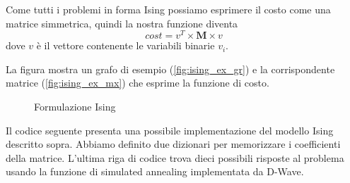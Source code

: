 Come tutti i problemi in forma Ising possiamo esprimere il costo come una matrice simmetrica, quindi la nostra funzione diventa
\[
cost = v^T \times \mathbf{M} \times v
\]
dove $v$ è il vettore contenente le variabili binarie $v_i$.

La figura mostra un grafo di esempio (\ref{fig:ising_ex_gr}) e la corrispondente matrice (\ref{fig:ising_ex_mx}) che esprime la funzione di costo.

\begin{figure}[h]
	\centering
	 \qquad
	\caption{Formulazione Ising}
	\label{fig:ising_ex}
\end{figure}

Il codice seguente presenta una possibile implementazione del modello Ising descritto sopra. Abbiamo definito due dizionari per memorizzare i coefficienti della matrice. L'ultima riga di codice trova dieci possibili risposte al problema usando la funzione di simulated annealing implementata da D-Wave.
\begin{listingenv}[H]
	\caption{Esempio Ising}
	\label{lst:ising_ex}
\end{listingenv}

